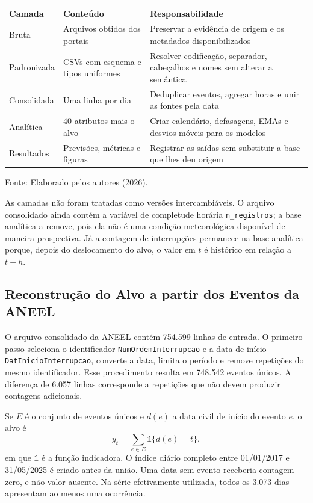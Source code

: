 \begin{quadro}[H]
\centering
\caption{Camadas da linhagem de dados}
\label{qua:camadas_linhagem}
\small
\begin{tabularx}{\textwidth}{p{2.7cm} p{3.6cm} X}
\toprule
\textbf{Camada} & \textbf{Conteúdo} & \textbf{Responsabilidade} \\
\midrule
Bruta & Arquivos obtidos dos portais & Preservar a evidência de origem e os metadados disponibilizados \\
Padronizada & CSVs com esquema e tipos uniformes & Resolver codificação, separador, cabeçalhos e nomes sem alterar a semântica \\
Consolidada & Uma linha por dia & Deduplicar eventos, agregar horas e unir as fontes pela data \\
Analítica & 40 atributos mais o alvo & Criar calendário, defasagens, EMAs e desvios móveis para os modelos \\
Resultados & Previsões, métricas e figuras & Registrar as saídas sem substituir a base que lhes deu origem \\
\bottomrule
\end{tabularx}
\small{Fonte: Elaborado pelos autores (2026).}
\end{quadro}

As camadas não foram tratadas como versões intercambiáveis. O arquivo consolidado ainda contém a variável de completude horária \texttt{n\_registros}; a base analítica a remove, pois ela não é uma condição meteorológica disponível de maneira prospectiva. Já a contagem de interrupções permanece na base analítica porque, depois do deslocamento do alvo, o valor em $t$ é histórico em relação a $t+h$.

\subsection{Reconstrução do Alvo a partir dos Eventos da ANEEL}

O arquivo consolidado da ANEEL contém 754.599 linhas de entrada. O primeiro passo seleciona o identificador \texttt{NumOrdemInterrupcao} e a data de início \texttt{DatInicioInterrupcao}, converte a data, limita o período e remove repetições do mesmo identificador. Esse procedimento resulta em 748.542 eventos únicos. A diferença de 6.057 linhas corresponde a repetições que não devem produzir contagens adicionais.

Se $E$ é o conjunto de eventos únicos e $d(e)$ a data civil de início do evento $e$, o alvo é
\begin{equation}
    y_t=\sum_{e\in E}\mathbb{1}\{d(e)=t\},
\end{equation}
em que $\mathbb{1}$ é a função indicadora. O índice diário completo entre 01/01/2017 e 31/05/2025 é criado antes da união. Uma data sem evento receberia contagem zero, e não valor ausente. Na série efetivamente utilizada, todos os 3.073 dias apresentam ao menos uma ocorrência.

